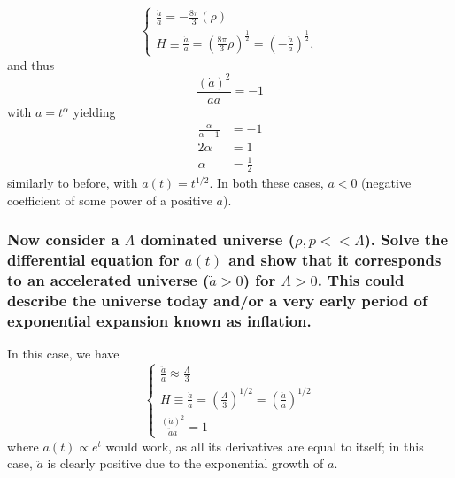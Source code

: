 \documentclass{article}
\begin{document}
\begin{equation*}
    \begin{cases}
        \frac{\ddot{a}}{a}=-\frac{8\pi}{3}(\rho)\\
        H\equiv \frac{\dot{a}}{a} = (\frac{8\pi}{3}\rho)^{\frac{1}{2}} = (-\frac{\ddot{a}}{a})^{\frac{1}{2}},
    \end{cases}
\end{equation*}
and thus 
\begin{equation*}
    \frac{(\dot{a})^2}{a\ddot{a}} = -1
\end{equation*}
with $a=t^{\alpha}$ yielding
\begin{equation*}
    \begin{aligned}
        \frac{\alpha}{\alpha - 1} &= -1 \\
        2\alpha &= 1 \\
        \alpha &= \frac{1}{2}
    \end{aligned}
\end{equation*}
similarly to before, with $a(t)=t^{1/2}$. In both these cases, $\ddot{a} < 0$ (negative coefficient of some power of a positive $a$). 

\subsubsection*{Now consider a $\Lambda$ dominated universe ($\rho, p << \Lambda$). Solve the differential equation for $a(t)$ and show that it corresponds to an accelerated universe ($\ddot{a}>0$) for $\Lambda >0$. This could describe the universe today and/or a very early period of exponential expansion known as inflation.}
In this case, we have 
\begin{equation*}
    \begin{cases}
        \frac{\ddot{a}}{a}\approx \frac{\Lambda}{3}\\
        H\equiv \frac{\dot{a}}{a} = (\frac{\Lambda}{3})^{1/2}=(\frac{\ddot{a}}{a})^{1/2} \\
        \frac{(\dot{a})^2}{\ddot{a}a}=1
    \end{cases}
\end{equation*}
where $a(t)\propto e^t$ would work, as all its derivatives are equal to itself; in this case, $\ddot{a}$ is clearly positive due to the exponential growth of $a$.
\newpage
\end{document}
